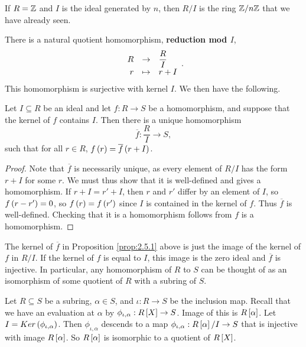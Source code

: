 \begin{example*}
If $ R = \Z $ and $ I $ is the ideal generated by $ n $, then $ R / I $ is the ring $ \Z / n\Z $ that we have already seen.
\end{example*}

\pagebreak

There is a natural quotient homomorphism, \textbf{reduction mod $ I $},
$$ \function{R}{\dfrac{R}{I}}{r}{r + I}. $$
This homomorphism is surjective with kernel $ I $. We then have the following.

\begin{proposition}
\label{prop:2.5.1}
Let $ I \subseteq R $ be an ideal and let $ f : R \to S $ be a homomorphism, and suppose that the kernel of $ f $ contains $ I $. Then there is a unique homomorphism
$$ \overline{f} : \dfrac{R}{I} \to S, $$
such that for all $ r \in R $, $ f\rb{r} = \overline{f}\rb{r + I} $.
\end{proposition}

\begin{proof}
Note that $ \overline{f} $ is necessarily unique, as every element of $ R / I $ has the form $ r + I $ for some $ r $. We must thus show that it is well-defined and gives a homomorphism. If $ r + I = r' + I $, then $ r $ and $ r' $ differ by an element of $ I $, so $ f\rb{r - r'} = 0 $, so $ f\rb{r} = f\rb{r'} $ since $ I $ is contained in the kernel of $ f $. Thus $ \overline{f} $ is well-defined. Checking that it is a homomorphism follows from $ f $ is a homomorphism.
\end{proof}

\begin{note*}
The kernel of $ \overline{f} $ in Proposition \ref{prop:2.5.1} above is just the image of the kernel of $ f $ in $ R / I $. If the kernel of $ f $ is equal to $ I $, this image is the zero ideal and $ \overline{f} $ is injective. In particular, any homomorphism of $ R $ to $ S $ can be thought of as an isomorphism of some quotient of $ R $ with a subring of $ S $.
\end{note*}

\begin{example*}
Let $ R \subseteq S $ be a subring, $ \alpha \in S $, and $ \iota : R \to S $ be the inclusion map. Recall that we have an evaluation at $ \alpha $ by $ \phi_{\iota, \alpha} : R\sb{X} \to S $. Image of this is $ R\sb{\alpha} $. Let $ I = Ker\rb{\phi_{\iota, \alpha}} $. Then $ \phi_{\iota, \alpha} $ descends to a map $ \phi_{\iota, \alpha} : R\sb{\alpha} / I \to S $ that is injective with image $ R\sb{\alpha} $. So $ R\sb{\alpha} $ is isomorphic to a quotient of $ R\sb{X} $.
\end{example*}

